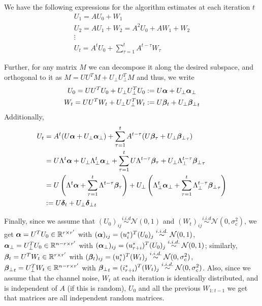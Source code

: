 \documentclass[10pt]{article}
\newcommand{\R}{\mathbb{R}}
\begin{document}
We have the following expressions for the algorithm estimates at each iteration $t$
\begin{gather*}
U_1 = A U_0 + W_1 \\
U_2 = A U_1 + W_2 = A^2 U_0 + A W_1 + W_2\\
\vdots \\
U_t = A^t U_0 + \sum_{\tau = 1}^t A^{t-\tau} W_\tau
\end{gather*}

Further, for any matrix $M$ we can decompose it along the desired subspace, and orthogonal to it as $M = U U^T M + U_{\perp} U_{\perp}^T M$ and thus, we write
\begin{gather*}
U_0 = U U^T U_0 + U_{\perp} U_{\perp}^T U_0 := U \bm{\alpha} + U_{\perp} \bm{\alpha}_{\perp} \\
W_t = U U^T W_t + U_{\perp} U_{\perp}^T W_t := U \bm{\beta}_t + U_{\perp} {\bm{\beta}_{\perp}}_t 
\end{gather*}
Additionally, 
\begin{align*}
U_t &= A^t (U \bm{\alpha} + U_{\perp} \bm{\alpha}_{\perp}) + \sum_{\tau = 1}^t A^{t-\tau} (U \bm{\beta}_\tau + U_{\perp} {\bm{\beta}_{\perp}}_\tau) \\
&= U \Lambda^t \bm{\alpha} + U_\perp \Lambda_\perp^t \bm{\alpha}_{\perp} + \sum_{\tau = 1}^t U \Lambda^{t-\tau} \bm{\beta}_\tau + U_\perp \Lambda_\perp^{t-\tau} {\bm{\beta}_{\perp}}_\tau \\
&= U\left( \Lambda^t \bm{\alpha} + \sum_{\tau=1}^t \Lambda^{t-\tau} \bm{\beta}_\tau \right) + U_\perp \left( \Lambda_\perp^t \bm{\alpha}_{\perp} + \sum_{\tau=1}^t \Lambda_\perp^{t-\tau} {\bm{\beta}_{\perp}}_\tau \right) \\
&:= U \bm{\delta}_t + U_\perp {\bm{\delta}_{\perp}}_t
\end{align*}

Finally, since we assume that $(U_0)_{ij} \overset{i.i.d}{\sim} \mathcal{N} (0,1)$ and $(W_t)_{ij} \overset{i.i.d}{\sim} \mathcal{N}(0, \sigma_c^2)$, we get $\ucos = U^T U_0 \in \R^{ r \times r'}$ with $(\bm{\alpha})_{ij} = (u_i^*)^T (U_0)_j \overset{i.i.d.}{\sim} \mathcal{N}(0, 1)$, $\usin = U_\perp^T U_0 \in \R^{n - r \times r'}$ with $(\bm{\alpha}_{\perp})_{ij} = (u_{r+i}^*)^T (U_0)_j \overset{i.i.d.}{\sim} \mathcal{N}(0, 1)$; similarly, $\wcos_t = U^T W_t \in \R^{r \times r'}$ with $(\bm{\beta}_t)_{ij} = (u_i^*)^T (W_t)_j \overset{i.i.d.}{\sim} \mathcal{N}(0, \sigma_c^2 )$, $\wsin_t = U_\perp^T W_t \in \R^{n-r \times r'}$ with  ${\bm{\beta}_{\perp}}_t = (i_{r+i}^*)^T (W_t)_j \overset{i.i.d.}{\sim} \mathcal{N}(0, \sigma_c^2)$. Also, since we assume that the channel noise, $W_t$ at each iteration is identically distributed, and is independent of $A$ (if this is random), $U_0$ and all the previous $W_{1:t-1}$ we get that matrices are all independent random matrices. 
\end{document}
